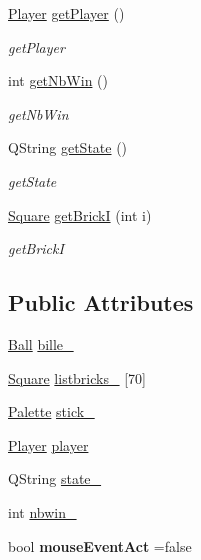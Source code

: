\begin{DoxyCompactItemize}
\mbox{\hyperlink{class_player}{Player}} \mbox{\hyperlink{class_game_manager_aebb883b6b25f5e017d315f692d5cd5a1}{get\+Player}} ()
\begin{DoxyCompactList}\small\item\em get\+Player \end{DoxyCompactList}\item 
int \mbox{\hyperlink{class_game_manager_a8b770addd88c3e9dba5691e38ec59a2b}{get\+Nb\+Win}} ()
\begin{DoxyCompactList}\small\item\em get\+Nb\+Win \end{DoxyCompactList}\item 
Q\+String \mbox{\hyperlink{class_game_manager_a0eb6a90c2608f741f37d870a7b90255c}{get\+State}} ()
\begin{DoxyCompactList}\small\item\em get\+State \end{DoxyCompactList}\item 
\mbox{\hyperlink{class_square}{Square}} \mbox{\hyperlink{class_game_manager_ac3efa1f197bd8d0869b41bd969e02fd0}{get\+BrickI}} (int i)
\begin{DoxyCompactList}\small\item\em get\+BrickI \end{DoxyCompactList}\end{DoxyCompactItemize}
\subsection*{Public Attributes}
\begin{DoxyCompactItemize}
\item 
\mbox{\hyperlink{class_ball}{Ball}} \mbox{\hyperlink{class_game_manager_a3c6413d0d78b839784ed4960d82d8501}{bille\+\_\+}}
\item 
\mbox{\hyperlink{class_square}{Square}} \mbox{\hyperlink{class_game_manager_a1f4d4e5f73f424ba4d04492e2b38cb88}{listbricks\+\_\+}} \mbox{[}70\mbox{]}
\item 
\mbox{\hyperlink{class_palette}{Palette}} \mbox{\hyperlink{class_game_manager_a086b81b6572ee3e4505143e284c2d503}{stick\+\_\+}}
\item 
\mbox{\hyperlink{class_player}{Player}} \mbox{\hyperlink{class_game_manager_af93b2a683a681a346d22577cd75a9dd5}{player}}
\item 
Q\+String \mbox{\hyperlink{class_game_manager_ade8777ca190763f4314035f7ee5905c2}{state\+\_\+}}
\item 
int \mbox{\hyperlink{class_game_manager_ac69eb2bd39346ff2c5304c6af93a6406}{nbwin\+\_\+}}
\item 
\mbox{\label{class_game_manager_a04e5a46806b4c6199a688f1e91ff2d0f}} 
bool {\bfseries mouse\+Event\+Act} =false
\end{DoxyCompactItemize}


